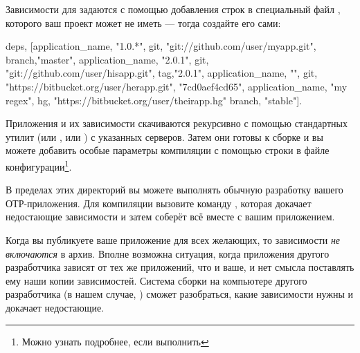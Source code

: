 \documentclass[11pt, oneside]{book}   	%
\begin{document}
Зависимости для  задаются с помощью добавления строк в специальный файл , которого ваш проект может не иметь --- тогда создайте его сами:

\begin{VerbatimText}
{deps,
 [{application_name, "1.0.*",
   {git, "git://github.com/user/myapp.git", {branch,"master"}}},
  {application_name, "2.0.1",
   {git, "git://github.com/user/hisapp.git", {tag,"2.0.1"}}},
  {application_name, "", 
   {git, "https://bitbucket.org/user/herapp.git",  "7cd0aef4cd65"}},
  {application_name, "my regex",
   {hg, "https://bitbucket.org/user/theirapp.hg" {branch, "stable"}}}]}.
\end{VerbatimText}

Приложения и их зависимости скачиваются рекурсивно с помощью стандартных утилит  (или , или ) с указанных серверов. Затем они готовы к сборке и вы можете добавить особые параметры компиляции с помощью строки  в файле конфигурации\footnote{Можно узнать подробнее, если выполнить }.

В пределах этих директорий вы можете выполнять обычную разработку вашего ОТР-приложения. Для компиляции вызовите команду , которая докачает недостающие зависимости и затем соберёт всё вместе с вашим приложением.

Когда вы публикуете ваше приложение для всех желающих, то зависимости \emph{не включаются} в архив. Вполне возможна ситуация, когда приложения другого разработчика зависят от тех же приложений, что и ваше, и нет смысла поставлять ему наши копии зависимостей. Система сборки на компьютере другого разработчика (в нашем случае, ) сможет разобраться, какие зависимости нужны и докачает недостающие.
\end{document}
